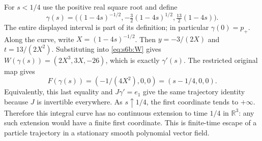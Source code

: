 For $s<1/4$ use the positive real square root and define
\begin{equation}
 \gamma(s)=\bigl((1-4s)^{-1/2},
          -\tfrac32(1-4s)^{1/2},\tfrac{13}{2}(1-4s)\bigr).
 \label{eq:s6b:trajectory}
\end{equation}
The entire displayed interval is part of its definition; in particular
$\gamma(0)=p_+$.  Along the curve, write $X=(1-4s)^{-1/2}$.
Then $y=-3/(2X)$ and $t=13/(2X^2)$.  Substituting into
\eqref{eq:s6b:W} gives
$W(\gamma(s))=(2X^3,3X,-26)$, which is exactly $\gamma'(s)$.
The restricted original map gives
\[
 F(\gamma(s))=(-1/(4X^2),0,0)=(s-1/4,0,0).
\]
Equivalently, this last equality and $J\gamma'=e_1$ give the same trajectory
identity because $J$ is invertible everywhere.  As $s\uparrow1/4$, the first
coordinate tends to $+\infty$.  Therefore this integral curve has no
continuous extension to time $1/4$ in $\mathbb R^3$: any such extension
would have a finite first coordinate.  This is finite-time escape of a
particle trajectory in a stationary smooth polynomial vector field.

